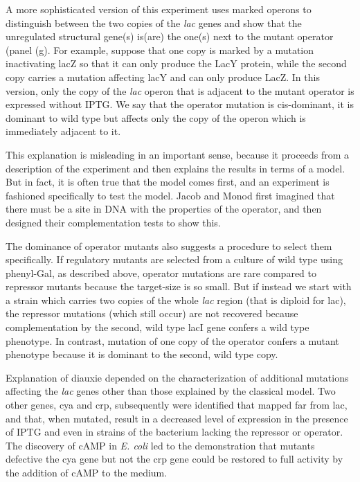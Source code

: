 A more sophisticated version of this experiment uses marked operons to distinguish between the two copies of the \emph{lac} genes and show that the unregulated structural gene(s) is(are) the one(s) next to the mutant operator (panel (g). For example, suppose that one copy is marked by a mutation inactivating lacZ so that it can only produce the LacY protein, while the second copy carries a mutation affecting lacY and can only produce LacZ. In this version, only the copy of the \emph{lac} operon that is adjacent to the mutant operator is expressed without IPTG. We say that the operator mutation is cis-dominant, it is dominant to wild type but affects only the copy of the operon which is immediately adjacent to it.

This explanation is misleading in an important sense, because it proceeds from a description of the experiment and then explains the results in terms of a model. But in fact, it is often true that the model comes first, and an experiment is fashioned specifically to test the model. Jacob and Monod first imagined that there must be a site in DNA with the properties of the operator, and then designed their complementation tests to show this.

The dominance of operator mutants also suggests a procedure to select them specifically. If regulatory mutants are selected from a culture of wild type using phenyl-Gal, as described above, operator mutations are rare compared to repressor mutants because the target-size is so small. But if instead we start with a strain which carries two copies of the whole \emph{lac} region (that is diploid for lac), the repressor mutations (which still occur) are not recovered because complementation by the second, wild type lacI gene confers a wild type phenotype. In contrast, mutation of one copy of the operator confers a mutant phenotype because it is dominant to the second, wild type copy.

Explanation of diauxie depended on the characterization of additional mutations affecting the \emph{lac} genes other than those explained by the classical model. Two other genes, cya and crp, subsequently were identified that mapped far from lac, and that, when mutated, result in a decreased level of expression in the presence of IPTG and even in strains of the bacterium lacking the repressor or operator. The discovery of cAMP in \emph{E. coli} led to the demonstration that mutants defective the cya gene but not the crp gene could be restored to full activity by the addition of cAMP to the medium.

